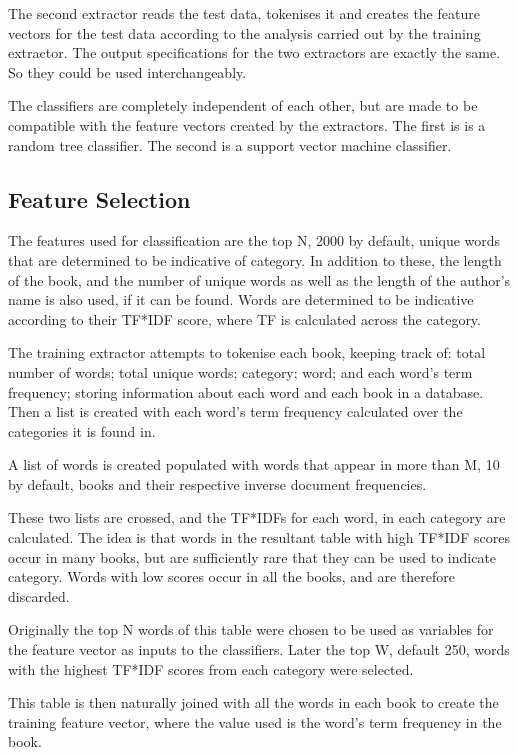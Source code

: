 \documentclass[11pt]{article}
\begin{document}
The second extractor reads the test data, tokenises it and creates the feature
vectors for the test data according to the analysis carried out by the training
extractor. The output specifications for the two extractors are exactly the
same. So they could be used interchangeably.

The classifiers are completely independent of each other, but are made to be
compatible with the feature vectors created by the extractors. The first is is a
random tree classifier. The second is a support vector machine classifier.

\subsection{Feature Selection}

The features used for classification are the top N, 2000 by default, unique
words that are determined to be indicative of category. In addition to these,
the length of the book, and the number of unique words as well as the length of
the author's name is also used, if it can be found.  Words are determined to be
indicative according to their TF*IDF score, where TF is calculated across the
category.

The training extractor attempts to tokenise each book, keeping track of: total
number of words; total unique words; category; word; and each word's term
frequency; storing information about each word and each book in a database.
Then a list is created with each word's term frequency calculated over the
categories it is found in.

A list of words is created populated with words that appear in more than M, 10
by default, books and their respective inverse document frequencies. 

These two lists are crossed, and the TF*IDFs for each word, in each category are
calculated. The idea is that words in the resultant table with high TF*IDF
scores occur in many books, but are sufficiently rare that they can be used to
indicate category. Words with low scores occur in all the books, and are
therefore discarded.

Originally the top N words of this table were chosen to be used as variables for
the feature vector as inputs to the classifiers. Later the top W, default 250,
words with the highest TF*IDF scores from each category were selected.

This table is then naturally joined with all the words in each book to create
the training feature vector, where the value used is the word's term frequency
in the book. 
\end{document}
